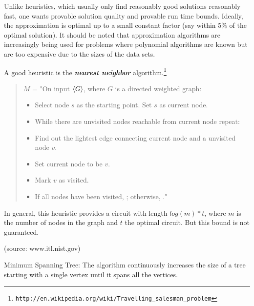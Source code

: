 \documentclass[a4paper,blends,pdf,colorBG,slideColor]{prosper}
\begin{document}
Unlike heuristics, which usually only find reasonably good solutions reasonably fast, one wants provable solution quality and provable run time bounds. Ideally, the approximation is optimal up to a small constant factor (say within 5\% of the optimal solution). It should be noted that approximation algorithms are increasingly being used for problems where polynomial algorithms are known but are too expensive due to the sizes of the data sets.
\es

A good heuristic is the {\bf\em nearest neighbor} algorithm.\footnote{{\tt http://en.wikipedia.org/wiki/Travelling\_salesman\_problem}}
\begin{quote}
$M$ = "On input $\langle {G} \rangle$, where $G$ is a directed weighted graph:
\begin{itemize}
\item[1.] Select node $s$ as the starting point.  Set $s$ as current node.
\item[2.] While there are unvisited nodes reachable from current node repeat:
\item[3.] \mytab Find out the lightest edge connecting current node and a unvisited node $v$.
\item[4.] \mytab Set current node to be $v$.
\item[5.] \mytab Mark $v$ as visited.
\item[6.] If all nodes have been visited, \accept; otherwise, \reject."
\end{itemize}
\end{quote}
In general, this heuristic provides a circuit with length $log(m)*t$, where $m$ is the number of nodes in the graph and $t$ the optimal circuit.  But this bound is not guaranteed.
\es

\vspace{.2in}
\vspace{.5in}
(source: www.itl.nist.gov)
\es


Minimum Spanning Tree: The algorithm continuously increases the size of a tree starting with a single vertex until it spans all the vertices.
\end{document}
